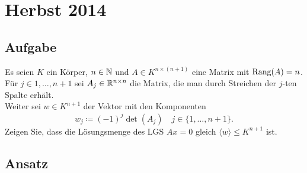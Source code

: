 \section{Herbst 2014}

\subsection{Aufgabe}
Es seien \( K \) ein Körper, \( n \in \mathbb{N} \) und \( A \in K^{n \times (n+1)} \) eine Matrix mit \( \text{Rang}(A) = n \).
\\
Für \( j \in 1, \dots, n+1 \) sei \( A_j \in \mathbb{R}^{n \times n} \) die Matrix, die man durch Streichen der \( j \)-ten Spalte erhält.
\\
Weiter sei \( w \in K^{n+1} \) der Vektor mit den Komponenten
\begin{equation*}
	w_j \coloneqq (-1)^j\det(A_j) \quad j \in \{ 1, \dots, n+1 \}\text{.}
\end{equation*}
Zeigen Sie, dass die Lösungsmenge des LGS \( Ax = 0 \) gleich \( \langle w \rangle \leq K^{n+1} \) ist.

\subsection{Ansatz}

